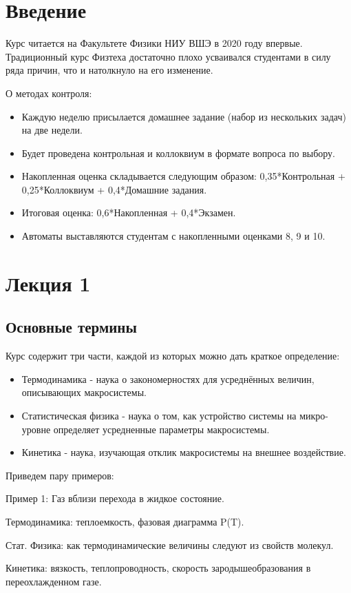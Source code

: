 \documentclass[a4paper, 12pt]{article}
\begin{document}
	\section*{Введение}
	Курс читается на Факультете Физики НИУ ВШЭ в 2020 году впервые. Традиционный курс Физтеха достаточно плохо усваивался студентами в силу ряда причин, что  и натолкнуло на его изменение.
	
	О методах контроля:
	\begin{itemize}
		\item Каждую неделю присылается домашнее задание (набор из нескольких задач) на две недели.
		\item Будет проведена контрольная и коллоквиум в формате вопроса по выбору.
		\item Накопленная оценка складывается следующим образом: 0,35*Контрольная + 0,25*Коллоквиум + 0,4*Домашние задания.
		\item Итоговая оценка: 0,6*Накопленная + 0,4*Экзамен.
		\item Автоматы выставляются студентам с накопленными оценками 8, 9 и 10.
	\end{itemize}
	\newpage
	\section{Лекция 1}
	\subsection{Основные термины}
	Курс содержит три части, каждой из которых можно дать краткое определение:
	\begin{itemize}
		\item Термодинамика - наука о закономерностях для усреднённых величин, описывающих макросистемы.
		\item Статистическая физика - наука о том, как устройство системы на микро-уровне определяет усредненные параметры макросистемы.
		\item Кинетика - наука, изучающая отклик макросистемы на внешнее воздействие.
	\end{itemize}
	Приведем пару примеров:
	
	Пример 1: Газ вблизи перехода в жидкое состояние.
	
	Термодинамика: теплоемкость, фазовая диаграмма P(T).
	
	Стат. Физика: как термодинамические величины следуют из свойств молекул.
	
	Кинетика: вязкость, теплопроводность, скорость зародышеобразования в переохлажденном газе.
	
\end{document}
